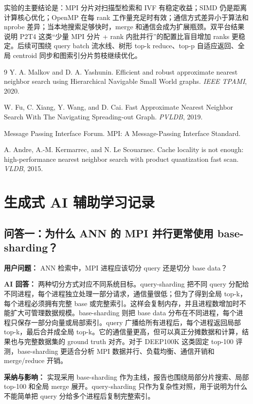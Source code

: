 \documentclass[11pt,a4paper]{article}
\begin{document}
实验的主要结论是：MPI 分片对扫描型检索和 IVF 有稳定收益；SIMD 仍是距离计算核心优化；OpenMP 在每 rank 工作量充足时有效；通信方式差异小于算法和 nprobe 差异；当本地搜索足够快时，merge 和通信会成为扩展瓶颈。双平台结果说明 P2T4 这类“少量 MPI 分片 + rank 内批并行”的配置比盲目增加 ranks 更稳定。后续可围绕 query batch 流水线、树形 top-k reduce、top-p 自适应返回、全局 centroid 同步和图索引分片剪枝继续优化。

\begin{thebibliography}{9}
Y. A. Malkov and D. A. Yashunin. Efficient and robust approximate nearest neighbor search using Hierarchical Navigable Small World graphs. \emph{IEEE TPAMI}, 2020.

W. Fu, C. Xiang, Y. Wang, and D. Cai. Fast Approximate Nearest Neighbor Search With The Navigating Spreading-out Graph. \emph{PVLDB}, 2019.

Message Passing Interface Forum. MPI: A Message-Passing Interface Standard.

A. Andre, A.-M. Kermarrec, and N. Le Scouarnec. Cache locality is not enough: high-performance nearest neighbor search with product quantization fast scan. \emph{VLDB}, 2015.
\end{thebibliography}

\appendix
\section{生成式 AI 辅助学习记录}

\subsection*{问答一：为什么 ANN 的 MPI 并行更常使用 base-sharding？}
\textbf{用户问题：} ANN 检索中，MPI 进程应该切分 query 还是切分 base data？

\textbf{AI 回答：} 两种切分方式对应不同系统目标。query-sharding 把不同 query 分配给不同进程，每个进程独立处理一部分请求，通信量很低；但为了得到全局 top-k，每个进程必须拥有完整 base 或完整索引。这样会复制内存，并且进程数增加时不能扩大可管理数据规模。base-sharding 则把 base data 分布在不同进程，每个进程只保存一部分向量或局部索引。query 广播给所有进程后，每个进程返回局部 top-k，最后合并成全局 top-k。它的通信量更高，但可以真正分摊数据和计算，结果也与完整数据集的 ground truth 对齐。对于 DEEP100K 这类固定 top-100 评测，base-sharding 更适合分析 MPI 数据并行、负载均衡、通信开销和 merge/reduce 开销。

\textbf{采纳与影响：} 实现采用 base-sharding 作为主线，报告也围绕局部分片搜索、局部 top-100 和全局 merge 展开。query-sharding 只作为复杂性对照，用于说明为什么不能简单把 query 分给多个进程后复制完整索引。
\end{document}
